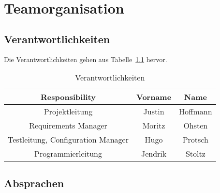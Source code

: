 \chapter{Teamorganisation}\label{ch:teamorganisation}



\section{Verantwortlichkeiten}\label{sec:verantwortlichkeiten}

Die Verantwortlichkeiten gehen aus Tabelle~\ref{tab:verantwortlichkeiten} hervor.

\begin{table}[h]
    \begin{center}
        \begin{tabular}{ |c|c|c| }
            \hline
            Responsibility                     & Vorname & Name     \\
            \hline\hline
            Projektleitung                     & Justin  & Hoffmann \\
            \hline
            Requirements Manager               & Moritz  & Ohsten   \\
            \hline
            Testleitung, Configuration Manager & Hugo    & Protsch  \\
            \hline
            Programmierleitung                 & Jendrik & Stoltz   \\
            \hline
        \end{tabular}
    \end{center}
    \caption{Verantwortlichkeiten}
    \label{tab:verantwortlichkeiten}
\end{table}


\section{Absprachen}\label{sec:absprachen}



